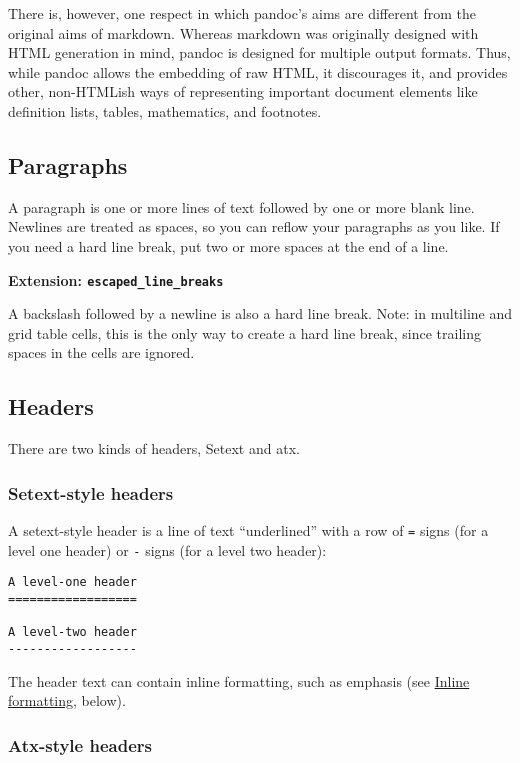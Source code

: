 \documentclass[]{article}
\begin{document}
There is, however, one respect in which pandoc's aims are different from
the original aims of markdown. Whereas markdown was originally designed
with HTML generation in mind, pandoc is designed for multiple output
formats. Thus, while pandoc allows the embedding of raw HTML, it
discourages it, and provides other, non-HTMLish ways of representing
important document elements like definition lists, tables, mathematics,
and footnotes.

\subsection{Paragraphs}

A paragraph is one or more lines of text followed by one or more blank
line. Newlines are treated as spaces, so you can reflow your paragraphs
as you like. If you need a hard line break, put two or more spaces at
the end of a line.

\textbf{Extension: \texttt{escaped\_line\_breaks}}

A backslash followed by a newline is also a hard line break. Note: in
multiline and grid table cells, this is the only way to create a hard
line break, since trailing spaces in the cells are ignored.

\subsection{Headers}

There are two kinds of headers, Setext and atx.

\subsubsection{Setext-style headers}

A setext-style header is a line of text ``underlined'' with a row of
\texttt{=} signs (for a level one header) or \texttt{-} signs (for a
level two header):

\begin{verbatim}
A level-one header
==================

A level-two header
------------------
\end{verbatim}

The header text can contain inline formatting, such as emphasis (see
\hyperref[inline-formatting]{Inline formatting}, below).

\subsubsection{Atx-style headers}
\end{document}

